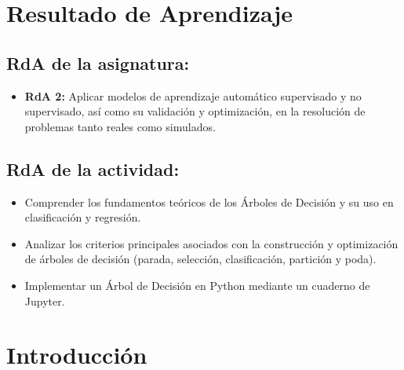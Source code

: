 \documentclass[a4,11pt]{aleph-notas}
\begin{document}
\encabezado


\section*{Resultado de Aprendizaje}

\subsection*{RdA de la asignatura:}
\begin{itemize}[leftmargin=*]
    \item \textbf{RdA 2:} Aplicar modelos de aprendizaje automático supervisado y no supervisado, así como su validación y optimización, en la resolución de problemas tanto reales como simulados.
\end{itemize}

\subsection*{RdA de la actividad:}
\begin{itemize}[leftmargin=*]
    \item Comprender los fundamentos teóricos de los Árboles de Decisión y su uso en clasificación y regresión.
    \item Analizar los criterios principales asociados con la construcción y optimización de árboles de decisión (parada, selección, clasificación, partición y poda).
    \item Implementar un Árbol de Decisión en Python mediante un cuaderno de Jupyter.
\end{itemize}

\section*{Introducción}
\end{document}
